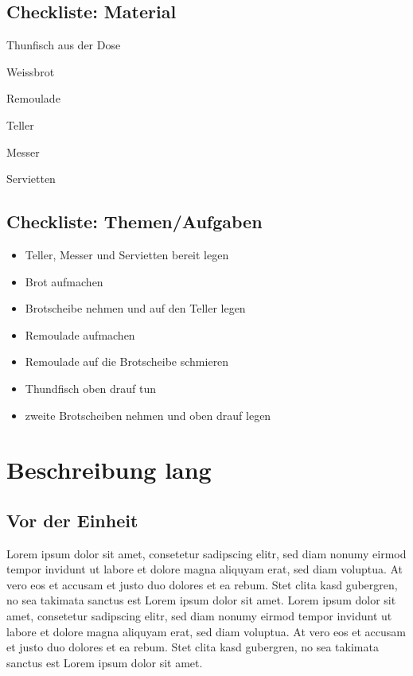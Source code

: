 \documentclass[a4paper,11pt]{scrartcl} %
\newenvironment{myitemize}{\begin{itemize}\itemsep -2pt}{\end{itemize}} %
\begin{document}
  \subsection{Checkliste: Material} %
    \begin{multicols}{2}[]
      \begin{myitemize}
      \begin{raggedright}
	\item[\Square] Thunfisch aus der Dose
	\item[\Square] Weissbrot
	\item[\Square] Remoulade
	\item[\Square] Teller
	\item[\Square] Messer
	\item[\Square] Servietten
      \end{raggedright}
      \end{myitemize}
    \end{multicols}
  \subsection{Checkliste: Themen/Aufgaben} %
      \begin{myitemize}
	\item[\Square] Teller, Messer und Servietten bereit legen
	\item[\Square] Brot aufmachen
	\item[\Square] Brotscheibe nehmen und auf den Teller legen
	\item[\Square] Remoulade aufmachen
	\item[\Square] Remoulade auf die Brotscheibe schmieren
	\item[\Square] Thundfisch oben drauf tun
	\item[\Square] zweite Brotscheiben nehmen und oben drauf legen
      \end{myitemize}

 
\section{Beschreibung lang} 

  \subsection{Vor der Einheit} %
Lorem ipsum dolor sit amet, consetetur sadipscing elitr, sed diam nonumy 
eirmod tempor invidunt ut labore et dolore magna aliquyam erat, sed diam 
voluptua. At vero eos et accusam et justo duo dolores et ea rebum. Stet 
clita kasd gubergren, no sea takimata sanctus est Lorem ipsum dolor sit 
amet. Lorem ipsum dolor sit amet, consetetur sadipscing elitr, sed diam 
nonumy eirmod tempor invidunt ut labore et dolore magna aliquyam erat, 
sed diam voluptua. At vero eos et accusam et justo duo dolores et ea rebum. 
Stet clita kasd gubergren, no sea takimata sanctus est Lorem ipsum dolor sit 
amet.
\end{document}
